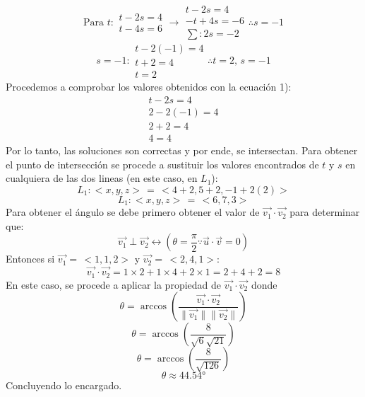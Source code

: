 \documentclass[letterpaper, 12pt]{article}
\begin{document}
\[\text{Para }t: \begin{matrix}
    t-2s=4\\
    t-4s=6
\end{matrix}\rightarrow \begin{matrix}
    t-2s=4\\
    -t+4s=-6\\
 \sum: 2s=-2   
\end{matrix}\therefore s=-1\]
\[s=-1: \begin{matrix}
    t-2(-1)=4\\
    t+2=4\\
    t=2
\end{matrix}\therefore t=2,\,s=-1\]
Procedemos a comprobar los valores obtenidos con la ecuación 1):
\[\begin{matrix}
    t-2s=4\\
    2-2(-1)=4\\
    2+2=4\\
    4=4
\end{matrix}\]
Por lo tanto, las soluciones son correctas y por ende, se intersectan. Para obtener el punto de intersección se procede a sustituir los valores encontrados de \(t\) y \(s\)
en cualquiera de las dos lineas (en este caso, en \(L_1\)):
\[L_1: <\!x,y,z\!>\,=\,<\!4+2,5+2,-1+2(2)\!>\]
\[L_1: <\!x,y,z\!>\,=\,<\!6,7,3>\]
Para obtener el ángulo se debe primero obtener el valor de \(\vec{v_1}\cdot\vec{v_2}\) para determinar que:
\[\vec{v_1}\perp \vec{v_2} \leftrightarrow \left(\theta=\frac{\pi}{2}\because \vec{u}\cdot\vec{v}=0\right)\]
Entonces si \(\vec{v_1}=\,<\!1,1,2\!>\) y \(\vec{v_2}=\,<\!2,4,1\!>\):
\[\vec{v_1}\cdot\vec{v_2}=1\times 2+1\times 4+2\times 1=2+4+2=8\]
En este caso, se procede a aplicar la propiedad de \(\vec{v_1}\cdot\vec{v_2}\) donde
\[\theta = \arccos \left(\frac{\vec{v_1}\cdot\vec{v_2}}{\lVert \vec{v_1}\rVert \lVert \vec{v_2}\rVert}\right)\]
\[\theta = \arccos \left(\frac{8}{\sqrt{6}\sqrt{21}}\right)\]
\[\theta = \arccos \left(\frac{8}{\sqrt{126}}\right)\]
\[\theta \approx 44.54\text{°}\]
Concluyendo lo encargado.
\end{document}
